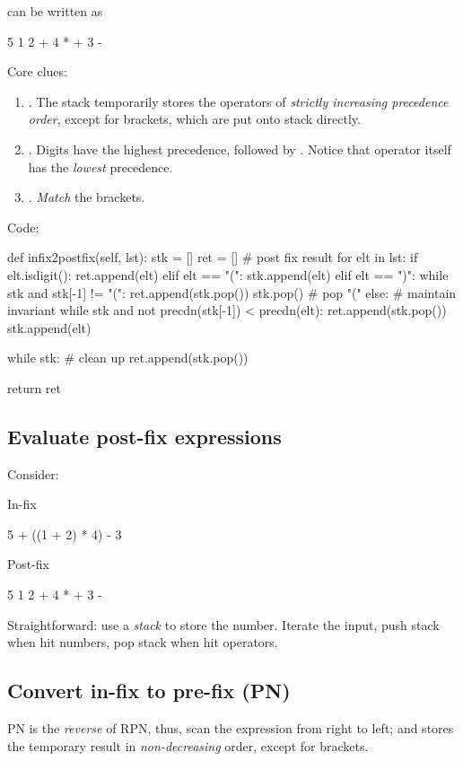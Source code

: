 can be written as
\begin{python}
5 1 2 + 4 * + 3 - 
\end{python}
Core clues:
\begin{enumerate}
\item {}. The stack temporarily stores the operators of \textit{strictly increasing precedence order}, except for brackets, which are put onto stack directly.
\item {}. Digits have the highest precedence, followed by \pyinline{*, /, +, (}. Notice that \pyinline{(} operator itself has the \textit{lowest} precedence.
\item {}. \textit{Match} the brackets. 
\end{enumerate}
Code:
\begin{python}
def infix2postfix(self, lst):
  stk = []
  ret = []  # post fix result
  for elt in lst:
    if elt.isdigit():
      ret.append(elt)
    elif elt == "(":
      stk.append(elt)
    elif elt == ")":
      while stk and stk[-1] != "(":
        ret.append(stk.pop())
      stk.pop()  # pop "("
    else:
      # maintain invariant
      while stk and not precdn(stk[-1]) < precdn(elt):
        ret.append(stk.pop())
      stk.append(elt)

  while stk:  # clean up 
    ret.append(stk.pop())

  return ret
\end{python}

\subsection{Evaluate post-fix expressions}\label{section:evaluationPostFix}
Consider: 

In-fix
\begin{python}
5 + ((1 + 2) * 4) - 3
\end{python}

Post-fix
\begin{python}
5 1 2 + 4 * + 3 - 
\end{python}
Straightforward: use a \textit{stack} to store the number. Iterate the input, push
stack when hit numbers, pop stack when hit operators.

\subsection{Convert in-fix to pre-fix (PN)}
PN is the \textit{reverse} of RPN, thus, scan the expression from right to left; and  stores the temporary result in \textit{non-decreasing} order, except for brackets.


